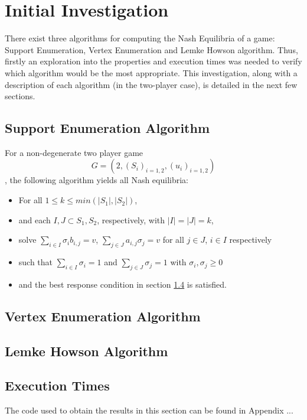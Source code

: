 \chapter{Initial Investigation}

There exist three algorithms for computing the Nash Equilibria of a game:
Support Enumeration, Vertex Enumeration and Lemke Howson algorithm. Thus,
firstly an exploration into the properties and execution times was needed to
verify which algorithm would be the most appropriate. This investigation, along
with a description of each algorithm (in the two-player case), is detailed in the next few sections.

\section{Support Enumeration Algorithm}
For a non-degenerate two player game $$G = (2, (S_{i})_{i = 1, 2}, (u_{i})_{i =
1, 2})$$, the following algorithm yields all Nash equilibria:
    \begin{itemize}
        \item For all $1 \le k \le min(|S_{1}|, |S_{2}|)$,
        \item and each $I, J \subset S_{1}, S_{2}$, respectively, with $|I| =
        |J| = k$,
        \item solve $\sum_{i \in I}{\sigma_{i}b_{i, j} = v}$,
        $\sum_{j \in J}{a_{i, j}\sigma_{j} = v}$ for all $j \in J$, $i \in I$ respectively
        \item such that $\sum_{i \in I}{\sigma_{i}}=1$ and $\sum_{j \in
        J}{\sigma_{j}}=1$ with $\sigma_{i}, \sigma_{j} \ge 0$
        \item and the best response condition in section \ref{} is satisfied.
    \end{itemize}




\section{Vertex Enumeration Algorithm}


\section{Lemke Howson Algorithm}


\section{Execution Times}
The code used to obtain the results in this section can be found in Appendix ...

